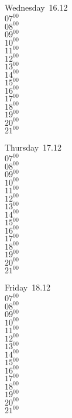 \documentclass[11pt,a4paper]{book}\usepackage[]{graphicx}\usepackage[]{color}
\begin{document}
\begin{weekdaybox}
  Wednesday~16.12\\
  { 
  \vfill
  $07^{00}$\\
$08^{00}$\\
$09^{00}$\\
$10^{00}$\\
$11^{00}$\\
$12^{00}$\\
$13^{00}$\\
$14^{00}$\\
$15^{00}$\\
$16^{00}$\\
$17^{00}$\\
$18^{00}$\\
$19^{00}$\\
$20^{00}$\\
$21^{00}$\\
  }
\end{weekdaybox}
\clearpage
\begin{headerbox}
\end{headerbox}
\begin{weekdaybox}
  Thursday~17.12\\
  { 
  \vfill
  $07^{00}$\\
$08^{00}$\\
$09^{00}$\\
$10^{00}$\\
$11^{00}$\\
$12^{00}$\\
$13^{00}$\\
$14^{00}$\\
$15^{00}$\\
$16^{00}$\\
$17^{00}$\\
$18^{00}$\\
$19^{00}$\\
$20^{00}$\\
$21^{00}$\\
  }
\end{weekdaybox} 
\begin{weekdaybox}
  Friday~18.12\\
  { 
  \vfill
  $07^{00}$\\
$08^{00}$\\
$09^{00}$\\
$10^{00}$\\
$11^{00}$\\
$12^{00}$\\
$13^{00}$\\
$14^{00}$\\
$15^{00}$\\
$16^{00}$\\
$17^{00}$\\
$18^{00}$\\
$19^{00}$\\
$20^{00}$\\
$21^{00}$\\
  }
\end{weekdaybox}
\end{document}
